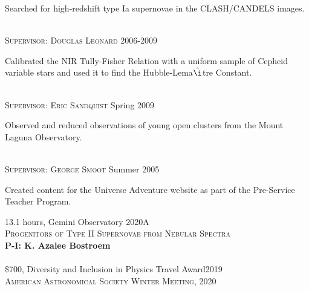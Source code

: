 \documentclass[10pt]{cv}
\begin{document}
\begin{llist}
\begin{minipage}[l]{0.7\textwidth}\vspace{0.15cm}
Searched for high-redshift type Ia supernovae in the CLASH/CANDELS images.\\
\end{minipage}
\\
\textsc{Supervisor: Douglas Leonard} \hfill 2006-2009 \\
\begin{minipage}[l]{0.7\textwidth}\vspace{0.15cm}
Calibrated the NIR Tully-Fisher Relation with a uniform sample of Cepheid variable stars and used it to find the Hubble-Lema$\rm{\hat{\i}}$tre Constant.\\
\end{minipage}
\\
\textsc{Supervisor: Eric Sandquist} \hfill Spring 2009\\
\begin{minipage}[l]{0.7\textwidth}\vspace{0.15cm}
Observed and reduced observations of young open clusters from the Mount Laguna Observatory. \\ 
\end{minipage}
\\
\textsc{Supervisor: George Smoot} \hfill Summer 2005\\
\begin{minipage}[l]{0.7\textwidth}\vspace{0.15cm}
Created content for the Universe Adventure website as part of the 
Pre-Service Teacher Program.\\
\end{minipage}
\vspace{-0.1in}
13.1 hours, Gemini Observatory \hfill 2020A\\
\textsc{Progenitors of Type II Supernovae from Nebular Spectra}\\
\textbf{P-I: K. Azalee Bostroem}\\
\\   
\$700, Diversity and Inclusion in Physics Travel Award\hfill 2019\\
\textsc{American Astronomical Society Winter Meeting, 2020}\\
\\

\end{llist}
\end{document}

